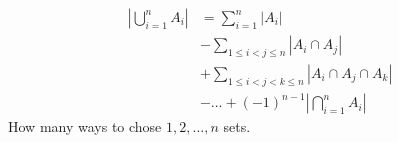 \begin{align*}
\left | \bigcup_{i=1}^{n} A_{i} \right |
& = \sum_{i=1}^{n} \left | A_{i} \right | \\
& - \sum_{1 \leq i < j \leq n} \left | A_{i} \cap A_{j} \right | \\
& + \sum_{1 \leq i < j < k \leq n} \left | A_{i} \cap A_{j} \cap A_{k} \right | \\
& - ... + (-1)^{n-1} \left | \bigcap_{i=1}^{n} A_{i} \right |
\end{align*}
How many ways to chose $ 1, 2, ..., n $ sets.
